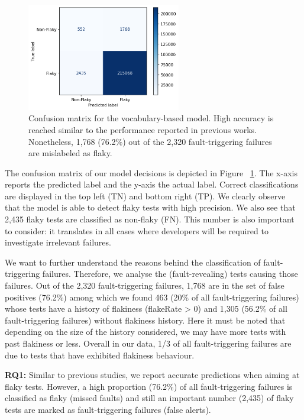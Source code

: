 \begin{figure}[ht]
\centering
\includegraphics[width=0.6\textwidth]{figures/chromium/rq1.png}
\caption{Confusion matrix for the vocabulary-based model. High accuracy is reached similar to the performance reported in previous works. Nonetheless, 1,768 (76.2\%) out of the 2,320 fault-triggering failures are mislabeled as flaky.}
\label{fig:confMatrix}
\end{figure}

The confusion matrix of our model decisions is depicted in Figure ~\ref{fig:confMatrix}. The x-axis reports the predicted label and the y-axis the actual label. Correct classifications are displayed in the top left (TN) and bottom right (TP). We clearly observe that the model is able to detect flaky tests with high precision. We also see that 2,435 flaky tests are classified as non-flaky (FN). This number is also important to consider: it translates in all cases where developers will be required to investigate irrelevant failures.

We want to further understand the reasons behind the classification of fault-triggering failures. Therefore, we analyse the (fault-revealing) tests causing those failures. Out of the 2,320 fault-triggering failures, 1,768 are in the set of false positives (76.2\%) among which we found 463 (20\% of all fault-triggering failures) whose tests have a history of flakiness (flakeRate > 0) and 1,305 (56.2\% of all fault-triggering failures) without flakiness history. Here it must be noted that depending on the size of the history considered, we may have more tests with past flakiness or less. Overall in our data, 1/3 of all fault-triggering failures are due to tests that have exhibited flakiness behaviour. 

\begin{tcolorbox}[
    left=2pt,right=2pt,top=2pt,bottom=2pt,
    arc=0pt,
    boxrule=1.2pt
]
\textbf{RQ1:} Similar to previous studies, we report accurate predictions when aiming at flaky tests. However, a high proportion (76.2\%) of all fault-triggering failures is classified as flaky (missed faults) and still an important number (2,435) of flaky tests are marked as fault-triggering failures (false alerts).
\end{tcolorbox}


